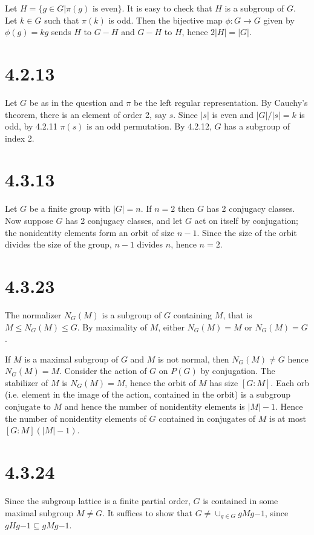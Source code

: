 \documentclass{article}
\def\inv{{-1}}
\begin{document}
Let $H = \{g \in G | \pi(g) \textrm{ is even}\}$. It is easy to check that $H$ is a subgroup of $G$. Let $k \in G$ such that $\pi(k)$ is odd. Then the bijective map $\phi: G \to G$ given by $\phi(g) = kg$ sends $H$ to $G - H$ and $G - H$ to $H$, hence $2|H| = |G|$.

\section*{4.2.13}

Let $G$ be as in the question and $\pi$ be the left regular representation. By Cauchy's theorem, there is an element of order 2, say $s$. Since $|s|$ is even and $|G| / |s| = k$ is odd, by 4.2.11 $\pi(s)$ is an odd permutation. By 4.2.12, $G$ has a subgroup of index 2.

\section*{4.3.13}

Let $G$ be a finite group with $|G| = n$. If $n = 2$ then $G$ has 2 conjugacy classes. Now suppose $G$ has 2 conjugacy classes, and let $G$ act on itself by conjugation; the nonidentity elements form an orbit of size $n-1$. Since the size of the orbit divides the size of the group, $n-1$ divides $n$, hence $n = 2$.

\section*{4.3.23}

The normalizer $N_G(M)$ is a subgroup of $G$ containing $M$, that is $M \le N_G(M) \le G$. By maximality of $M$, either $N_G(M) = M$ or $N_G(M) = G$. 

If $M$ is a maximal subgroup of $G$ and $M$ is not normal, then $N_G(M) \ne G$ hence $N_G(M) = M$. Consider the action of $G$ on $P(G)$ by conjugation. The stabilizer of $M$ is $N_G(M) = M$, hence the orbit of $M$ has size $[G:M]$. Each orb (i.e. element in the image of the action, contained in the orbit) is a subgroup conjugate to $M$ and hence the number of nonidentity elements is $|M|-1$. Hence the number of nonidentity elements of $G$ contained in conjugates of $M$ is at most $[G:M] (|M|-1)$.
\section*{4.3.24}

Since the subgroup lattice is a finite partial order, $G$ is contained in some maximal subgroup $M \ne G$. It suffices to show that $G \ne \cup_{g \in G} gMg\inv$, since $gHg\inv \subseteq gMg\inv$.
\end{document}
